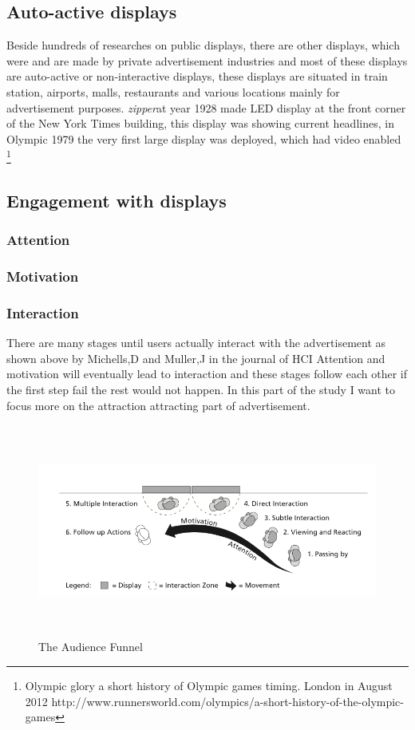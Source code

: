 \subsection{Auto-active displays}
Beside hundreds of researches on public displays, there are other displays, which were and are made by private advertisement industries and most of these displays are auto-active or non-interactive displays, these displays are situated in train station, airports, malls, restaurants and various locations mainly for advertisement purposes. \emph{zipper}\cite{zipper}at year 1928 made LED display at the front corner of the New York Times building, this display was showing current headlines, in Olympic 1979 the very first large display was deployed, which had video enabled \footnote{Olympic glory a short history of Olympic games timing. London in August 2012 http://www.runnersworld.com/olympics/a-short-history-of-the-olympic-games}






\subsection{Engagement with displays}
\subsubsection{Attention}
\subsubsection{Motivation}
\subsubsection{Interaction}
\newpage
There are many stages until users actually interact with the advertisement as shown above by Michells,D and Muller,J in the journal of HCI \cite{AudienceFunnel} Attention and motivation will eventually lead to interaction and these stages follow each other if the first step fail the rest would not happen. In this part of the study I want to focus more on the attraction attracting part of advertisement.

\begin{figure}[htp]
\centering
\includegraphics[width=120mm,height=70mm]{Figures/3/TheAudienceFunnel}
\caption{The Audience Funnel}
\label{fig:audience_funnel}
\end{figure}


